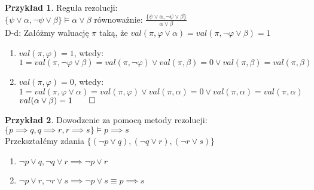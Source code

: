 \documentclass{article}
\theoremstyle{definition}
\theoremstyle{definition}
\theoremstyle{definition}
\newtheorem{pk}{Przykład}[subsection]
\theoremstyle{definition}
\begin{document}
\begin{pk}
    Reguła rezolucji:\\
    $\{\psi\lor\alpha,\neg\psi\lor\beta\} \models \alpha\lor\beta$
    równoważnie: $\frac{\{\psi\lor\alpha,\neg\psi\lor\beta\}}{\alpha\lor\beta}$\\
    D-d: Załóżmy waluację $\pi$ taką, że $val(\pi, \varphi\lor\alpha)=val(\pi,\neg\varphi\lor\beta)=1$
    \begin{enumerate}
        \item $val(\pi,\varphi)=1$, wtedy: \\
        $1=val(\pi,\neg\varphi\lor\beta)=val(\pi,\neg\varphi)\lor val(\pi,\beta)=0\lor val(\pi,\beta)=val(\pi,\beta)$
        \item $val(\pi, \varphi)=0$, wtedy: \\
        $1=val(\pi,\varphi\lor\alpha)=val(\pi,\varphi)\lor val(\pi,\alpha)=0\lor val(\pi,\alpha)=val(\pi, \alpha)$\\
        $val(\alpha\lor\beta)=1\qed$
    \end{enumerate}
\end{pk}

\begin{pk}
    Dowodzenie za pomocą metody rezolucji:\\
    $\{p\implies q, q\implies r, r\implies s\}\models p\implies s$\\
    Przekształćmy zdania $\{(\neg p \lor q),(\neg q \lor r),(\neg r \lor s)\}$
    \begin{enumerate}
        \item $\neg p \lor q, \neg q \lor r \implies \neg p\lor r$
        \item $\neg p \lor r, \neg r \lor s \implies \neg p\lor s \equiv p\implies s$
    \end{enumerate}
\end{pk}
\end{document}
